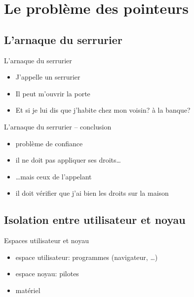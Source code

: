 \section{Le problème des pointeurs}

\subsection{L'arnaque du serrurier}

\begin{frame}{L'arnaque du serrurier}

\begin{itemize}
\item
  J'appelle un serrurier
\item
  Il peut m'ouvrir la porte
\item
  Et si je lui dis que j'habite chez mon voisin? à la banque?
\end{itemize}

\end{frame}
\begin{frame}{L'arnaque du serrurier -- conclusion}

\begin{itemize}
\item problème de confiance
\item il ne doit pas appliquer ses droits…
\item …mais ceux de l'appelant
\item il doit vérifier que j'ai bien les droits sur la maison
\end{itemize}

\end{frame}

\subsection{Isolation entre utilisateur et noyau}

\begin{frame}{Espaces utilisateur et noyau}
    \begin{itemize}
        \item espace utilisateur: programmes (navigateur, …)
        \item espace noyau: pilotes
        \item matériel
    \end{itemize}
\end{frame}

%
\newcommand{\mzone}[3]{
  \path[#3] (#1,0) rectangle (#2,1);
}

